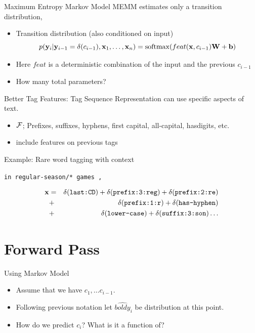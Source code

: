 \documentclass{beamer}
\begin{document}
\begin{frame}{Maximum Entropy Markov Model}
  MEMM estimates only a transition distribution,
  \begin{itemize}
  \item Transition distribution (also conditioned on input)
    \[p(\boldy_i | \boldy_{i-1}=\delta(c_{i-1}), \boldx_1, \ldots, \boldx_n) = \softmax(feat(\boldx, c_{i-1}) \boldW + \boldb) \]

  \item Here $feat$ is a deterministic combination of the input and the previous $c_{i-1}$   
  \end{itemize}
  \begin{itemize}
  \item How many total parameters?
  \end{itemize}
\end{frame}

\begin{frame}{Better Tag Features: Tag Sequence}
  Representation can use specific aspects of text.
  \begin{itemize}
  \item $\mathcal{F}$; Prefixes, suffixes, hyphens, first capital, all-capital, hasdigits, etc.
  \item {} include features on previous tags
  \end{itemize}

  Example: Rare word tagging with context

  \begin{center}
    \texttt{in  \alert{regular-season/*} games ,}
  \end{center}
  \begin{eqnarray*}
    \mathbf{x} &=& \delta(\texttt{last:CD}) + \delta(\texttt{prefix:3:reg}) + \delta(\texttt{prefix:2:re}) \\
    &+& \delta(\texttt{prefix:1:r}) + \delta(\texttt{has-hyphen}) \\
    &+& \delta(\texttt{lower-case}) + \delta(\texttt{suffix:3:son}) \ldots
  \end{eqnarray*}
\end{frame}


\section{Forward Pass}

\begin{frame}{Using Markov Model}
  \begin{itemize}
  \item Assume that we have $c_1, \ldots c_{i-1}$.
    \air 
  \item Following previous notation let $\hat{boldy}_i$ be distribution at this point.
    \air 

  \item How do we predict $c_i$? What is it a function of?
  \end{itemize}
\end{frame}
\end{document}
